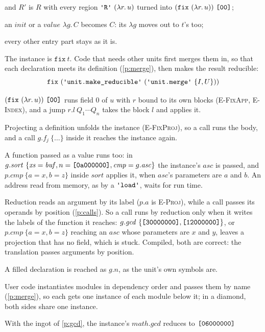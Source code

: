 \documentclass[11pt,letterpaper]{article}
\newcommand{\lam}[2]{\lambda #1.\,#2}       %
\newcommand{\rn}[1]{\textsc{#1}}                %
\newcommand{\kw}[1]{\mathtt{#1}}
\newcommand{\str}[1]{\text{\ttfamily\textquotesingle #1\textquotesingle}}  %
\newcommand{\hex}[1]{\text{\ttfamily [#1]}}  %
\newcommand{\pref}[1]{\ref{#1}}  %
\begin{document}
\begin{points}
\begin{subpoints}
    and $R'$ is $R$ with every region $\str{R}\ (\lam{r}{u})$ turned into $(\kw{fix}\ (\lam{r}{u}))\ \hex{00}$;
  \item an $\mathit{init}$ or a $\mathit{value}$ $\lam{g}{C}$ becomes $C$: its $\lambda g$ moves out to $t$'s too;
  \item every other entry part stays as it is.
  \end{subpoints}
  The instance is $\kw{fix}\ t$. Code that needs other units first merges them in, so that each
  declaration meets its definition (\pref{p:merge}), then makes the result reducible:
  \[\kw{fix}\ (\str{unit.make\_reducible}\ (\str{unit.merge}\ \{I, U\}))\]
  \begin{subpoints}
  \item $(\kw{fix}\ (\lam{r}{u}))\ \hex{00}$ runs field $0$ of $u$ with $r$ bound to
    its own blocks (\rn{E-FixApp}, \rn{E-Index}), and a jump $r.l\ Q_1 \cdots Q_n$ takes the block $l$ and applies it.
  \item Projecting a definition unfolds the instance (\rn{E-FixProj}), so a call runs the body, and a call
    $g.f_j\ \{\dots\}$ inside it reaches the instance again.
  \item A function passed as a value runs too: in $g.\mathit{sort}\ \{\mathit{xs} = \mathit{buf}, n = \hex{0a000000}, \mathit{cmp} = g.\mathit{asc}\}$ the
    instance's $\mathit{asc}$ is passed, and $p.\mathit{cmp}\ \{a = x, b = z\}$ inside $\mathit{sort}$ applies it, when $\mathit{asc}$'s parameters are $a$
    and $b$. An address read from memory, as by a $\str{load}$, waits for run time.
  \item Reduction reads an argument by its label ($p.a$ is \rn{E-Proj}), while a call passes its operands by position
    (\pref{p:calls}). So a call runs by reduction only when it writes the labels of the function it reaches:
    $g.\mathit{gcd}\ \{\hex{30000000}, \hex{12000000}\}$, or $p.\mathit{cmp}\ \{a = x, b = z\}$ reaching an $\mathit{asc}$ whose
    parameters are $x$ and $y$, leaves a projection that has no field, which is stuck. Compiled, both are correct: the
    translation passes arguments by position.
  \item A filled declaration is reached as $g.n$, as the unit's own symbols are.
  \item User code instantiates modules in dependency order and passes them by name (\pref{p:merge}),
    so each gets one instance of each module below it; in a diamond, both sides share one instance.
  \item With the ingot of \pref{p:gcd}, the instance's $\mathit{math}.\mathit{gcd}$ reduces to $\hex{06000000}$

\end{subpoints}
\end{points}
\end{document}
